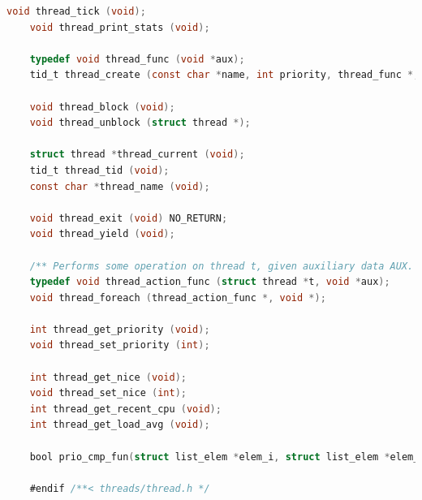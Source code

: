 \documentclass{article}
\begin{document}
\begin{lstlisting}[language=C, title=\texttt{thread.h}]
	void thread_tick (void);
	void thread_print_stats (void);
	
	typedef void thread_func (void *aux);
	tid_t thread_create (const char *name, int priority, thread_func *, void *);
	
	void thread_block (void);
	void thread_unblock (struct thread *);
	
	struct thread *thread_current (void);
	tid_t thread_tid (void);
	const char *thread_name (void);
	
	void thread_exit (void) NO_RETURN;
	void thread_yield (void);
	
	/** Performs some operation on thread t, given auxiliary data AUX. */
	typedef void thread_action_func (struct thread *t, void *aux);
	void thread_foreach (thread_action_func *, void *);
	
	int thread_get_priority (void);
	void thread_set_priority (int);
	
	int thread_get_nice (void);
	void thread_set_nice (int);
	int thread_get_recent_cpu (void);
	int thread_get_load_avg (void);
	
	bool prio_cmp_fun(struct list_elem *elem_i, struct list_elem *elem_e, void *add_debug_prefix_map);
	
	#endif /**< threads/thread.h */
	
\end{lstlisting}
\end{document}
